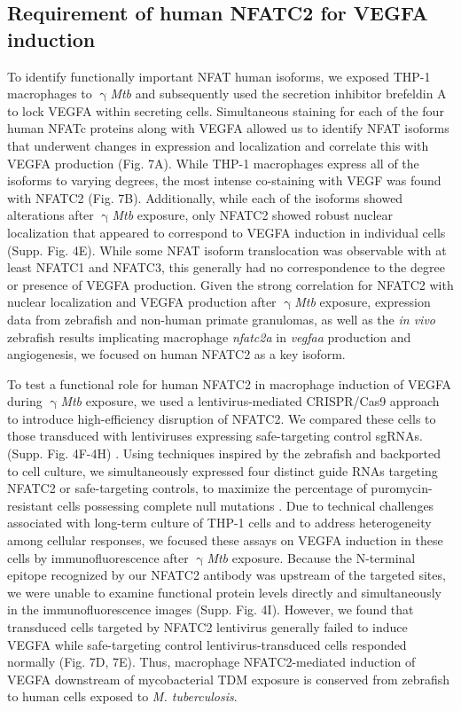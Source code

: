 \subsection{Requirement of human NFATC2 for VEGFA induction}

To identify functionally important NFAT human isoforms, we exposed THP-1 macrophages to $\upgamma$\textit{Mtb} and subsequently used the secretion inhibitor brefeldin A to lock VEGFA within secreting cells. Simultaneous staining for each of the four human NFATc proteins along with VEGFA allowed us to identify NFAT isoforms that underwent changes in expression and localization and correlate this with VEGFA production (Fig. 7A). While THP-1 macrophages express all of the isoforms to varying degrees, the most intense co-staining with VEGF was found with NFATC2 (Fig. 7B). Additionally, while each of the isoforms showed alterations after $\upgamma$\textit{Mtb} exposure, only NFATC2 showed robust nuclear localization that appeared to correspond to VEGFA induction in individual cells (Supp. Fig. 4E). While some NFAT isoform translocation was observable with at least NFATC1 and NFATC3, this generally had no correspondence to the degree or presence of VEGFA production. Given the strong correlation for NFATC2 with nuclear localization and VEGFA production after $\upgamma$\textit{Mtb} exposure, expression data from zebrafish and non-human primate granulomas, as well as the \textit{in vivo} zebrafish results implicating macrophage \textit{nfatc2a} in \textit{vegfaa} production and angiogenesis, we focused on human NFATC2 as a key isoform.

To test a functional role for human NFATC2 in macrophage induction of VEGFA during $\upgamma$\textit{Mtb} exposure, we used a lentivirus-mediated CRISPR/Cas9 approach to introduce high-efficiency disruption of NFATC2. We compared these cells to those transduced with lentiviruses expressing safe-targeting control sgRNAs. (Supp. Fig. 4F-4H) \citep{Kabadi2014, Sanjana2014, Morgens2017, Kitamura2021}. Using techniques inspired by the zebrafish and backported to cell culture, we simultaneously expressed four distinct guide RNAs targeting NFATC2 or safe-targeting controls, to maximize the percentage of puromycin-resistant cells possessing complete null mutations \citep{Wu2018}. Due to technical challenges associated with long-term culture of THP-1 cells and to address heterogeneity among cellular responses, we focused these assays on VEGFA induction in these cells by immunofluorescence after $\upgamma$\textit{Mtb} exposure. Because the N-terminal epitope recognized by our NFATC2 antibody was upstream of the targeted sites, we were unable to examine functional protein levels directly and simultaneously in the immunofluorescence images (Supp. Fig. 4I). However, we found that transduced cells targeted by NFATC2 lentivirus generally failed to induce VEGFA while safe-targeting control lentivirus-transduced cells responded normally (Fig. 7D, 7E). Thus, macrophage NFATC2-mediated induction of VEGFA downstream of mycobacterial TDM exposure is conserved from zebrafish to human cells exposed to \textit{M. tuberculosis}.

